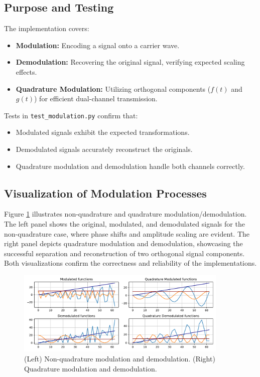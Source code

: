 \documentclass[12pt, a4paper]{report}
\begin{document}
\subsection{Purpose and Testing}
The implementation covers:
\begin{itemize}
	\item \textbf{Modulation:} Encoding a signal onto a carrier wave.
	\item \textbf{Demodulation:} Recovering the original signal, verifying expected scaling effects.
	\item \textbf{Quadrature Modulation:} Utilizing orthogonal components (\(f(t)\) and \(g(t)\)) for efficient dual-channel transmission.
\end{itemize}

Tests in \texttt{test\_modulation.py} confirm that:
\begin{itemize}
	\item Modulated signals exhibit the expected transformations.
	\item Demodulated signals accurately reconstruct the originals.
	\item Quadrature modulation and demodulation handle both channels correctly.
\end{itemize}

\subsection{Visualization of Modulation Processes}
Figure \ref{fig:modulation_visualizations} illustrates non-quadrature and quadrature modulation/demodulation. The left panel shows the original, modulated, and demodulated signals for the non-quadrature case, where phase shifts and amplitude scaling are evident. The right panel depicts quadrature modulation and demodulation, showcasing the successful separation and reconstruction of two orthogonal signal components. Both visualizations confirm the correctness and reliability of the implementations.

\begin{figure}[h!]
	\centering
	\includegraphics[width=0.9\textwidth]{figures/modulation.pdf}
	\caption{(Left) Non-quadrature modulation and demodulation. (Right) Quadrature modulation and demodulation.}
	\label{fig:modulation_visualizations}
\end{figure}
\end{document}
